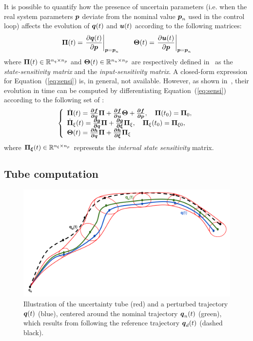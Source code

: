 It is possible to quantify how the presence of uncertain parameters (i.e. when the real system parameters $\boldsymbol{p}$ deviate from the nominal value $\boldsymbol{p}_n$ used in the control loop) affects the evolution of $\boldsymbol{q}(t)$ and $\boldsymbol{u}(t)$ according to the following matrices:
\begin{equation}\label{eq:sensi}
  \boldsymbol{\Pi}(t)=\left.\frac{\partial \boldsymbol{q}(t)}{\partial \boldsymbol{p}}\right|_{\boldsymbol{p}=\boldsymbol{p}_n} \quad\quad \boldsymbol{\Theta}(t)=\left.\frac{\partial \boldsymbol{u}(t)}{\partial \boldsymbol{p}}\right|_{\boldsymbol{p}=\boldsymbol{p}_n}
\end{equation}
where $\boldsymbol{\Pi}(t)\in \mathbb{R}^{n_q \times n_p}$ and $\boldsymbol{\Theta}(t)\in \mathbb{R}^{n_u \times n_p}$ are respectively defined in~\cite{cPi,cTh} as the \emph{state-sensitivity matrix} and the \emph{input-sensitivity matrix}.
A closed-form expression for Equation~(\ref{eq:sensi}) is, in general, not available. 
However, as shown in~\cite{cPi,cTh}, their evolution in time can be computed by differentiating Equation~(\ref{eq:sensi}) according to the following set of :
\begin{equation}\label{eq:dyna_sensi}
  \left \{
  \begin{array}{l l l}
       \dot{\boldsymbol{\Pi}}(t) = \boldsymbol{\frac{\partial{f}}{\partial{q}}}\boldsymbol{\Pi}+ \boldsymbol{\frac{\partial{f}}{\partial{u}}}\boldsymbol{\Theta}+ \boldsymbol{\frac{\partial{f}}{\partial{p}}}, \quad \boldsymbol{\Pi}(t_0)=\boldsymbol{\Pi}_0, \\
       \dot{\boldsymbol{\Pi}}_{\xi}(t) = \boldsymbol{\frac{\partial{g}}{\partial{q}}}\boldsymbol{\Pi}+ \boldsymbol{\frac{\partial{g}}{\partial{\xi}}}\boldsymbol{\Pi}_{\xi}, \quad \boldsymbol{\Pi}_{\xi}(t_0)=\boldsymbol{\Pi}_{\xi0}, \\
       \boldsymbol{\Theta}(t) = \boldsymbol{\frac{\partial{h}}{\partial{q}}}\boldsymbol{\Pi}+ \boldsymbol{\frac{\partial{h}}{\partial{\xi}}}\boldsymbol{\Pi}_{\xi} 
  \end{array}
  \right .
\end{equation}
where $\boldsymbol{\Pi_{\xi}}(t)\in \mathbb{R}^{n_{\xi} \times n_p}$ represents the \emph{internal state sensitivity} matrix.

\subsection{Tube computation}\label{sec:tubes}

\begin{figure} [t]
  \centering
  \includegraphics[width=0.8\linewidth]{figures/models/tubes.png} 
  \caption{Illustration of the uncertainty tube (red) and a perturbed trajectory $\boldsymbol{q}(t)$ (blue), centered around the nominal trajectory $\boldsymbol{q}_n(t)$ (green), which results from following the reference trajectory $\boldsymbol{q}_d(t)$ (dashed black).}%
  \label{fig:tubes}%
\end{figure}

